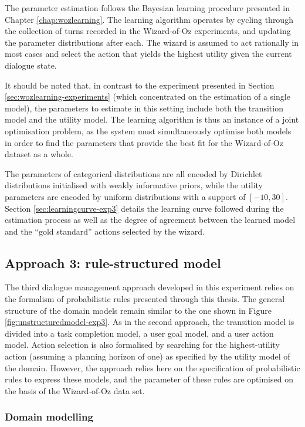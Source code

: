 The parameter estimation follows the Bayesian learning procedure presented in Chapter \ref{chap:wozlearning}. The learning algorithm operates by cycling through the collection of turns recorded in the Wizard-of-Oz experiments, and updating the parameter distributions after each.  The wizard is assumed to act rationally in most cases and select the action that yields the highest utility given the current dialogue state. 

It should be noted that, in contrast to the experiment presented in Section \ref{sec:wozlearning-experiments} (which concentrated on the estimation of a single model), the parameters to estimate in this setting include both the transition model and the utility model.  The learning algorithm is thus an instance of a joint optimisation problem, as the system must simultaneously optimise both models in order to find the parameters that provide the best fit for the Wizard-of-Oz dataset as a whole. 

The parameters of categorical distributions are all encoded by Dirichlet distributions initialised with weakly informative priors, while the utility parameters are encoded by uniform distributions with a support of $[-10, 30]$.  Section \ref{sec:learningcurve-exp3} details the learning curve followed during the estimation process as well as the degree of agreement between the learned model and the ``gold standard'' actions selected by the wizard. 

\subsection{Approach 3: rule-structured model}

The third dialogue management approach developed in this experiment relies on the formalism of probabilistic rules presented through this thesis.  The general structure of the domain models remain similar to the one shown in Figure \ref{fig:unstructuredmodel-exp3}.  As in the second approach, the transition model is divided into a task completion model, a user goal model, and a user action model.  Action selection is also formalised by searching for the highest-utility action (assuming a planning horizon of one) as specified by the utility model of the domain.  However, the approach relies here on the specification of probabilistic rules to express these models, and the parameter of these rules are optimised on the basis of the Wizard-of-Oz data set.

\subsubsection*{Domain modelling}

